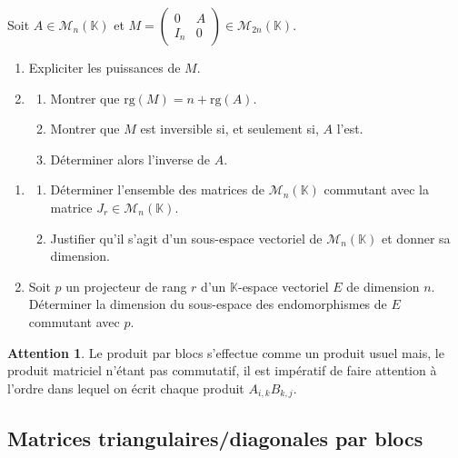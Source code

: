 \documentclass[french]{article}
\newcommand{\K}{\mathbb{K}}
\newcommand{\rg}{\text{rg}}
\theoremstyle{plain}
\theoremstyle{definition}
\newtheorem*{attention}{Attention}
\theoremstyle{remark}
\begin{document}
\begin{exo}
	Soit $A\in\mathcal{M}_n(\K)$ et $M=\begin{pmatrix}
		0&A\\
		I_n&0
	\end{pmatrix}\in\mathcal{M}_{2n}(\K)$.
	\begin{enumerate}
		\item Expliciter les puissances de $M$.
		\item \begin{enumerate}[label=(\alph*)]
			\item Montrer que $\rg(M)=n+\rg(A)$.
			\item Montrer que $M$ est inversible si, et seulement si, $A$ l'est.
			\item Déterminer alors l'inverse de $A$.
		\end{enumerate}
	\end{enumerate}
\end{exo}

\begin{exo}
	\begin{enumerate}
		\item \begin{enumerate}[label=(\alph*)]
			\item Déterminer l'ensemble des matrices de $\mathcal{M}_n(\K)$ commutant avec la matrice $J_r\in\mathcal{M}_n(\K)$.
			\item Justifier qu'il s'agit d'un sous-espace vectoriel de $\mathcal{M}_n(\K)$ et donner sa dimension.
		\end{enumerate}
		\item Soit $p$ un projecteur de rang $r$ d'un $\K$-espace vectoriel $E$ de dimension $n$. Déterminer la dimension du sous-espace des endomorphismes de $E$ commutant avec $p$.
	\end{enumerate}
\end{exo}

\begin{attention}
	Le produit par blocs s'effectue comme un produit usuel mais, le produit matriciel n'étant pas commutatif, il est impératif de faire attention à l'ordre dans lequel on écrit chaque produit $A_{i,k}B_{k,j}$.
\end{attention}

\subsection{Matrices triangulaires/diagonales par blocs}
\end{document}
